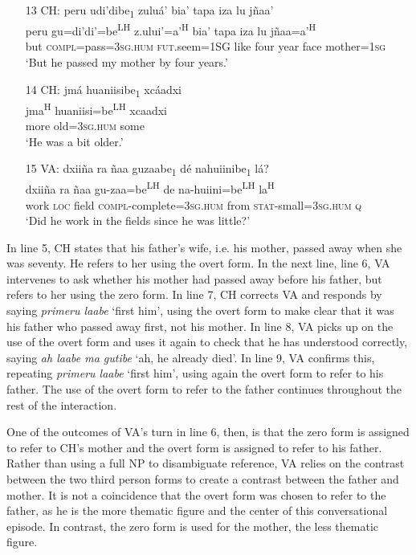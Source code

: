 \begin{itemize}
\item[13 CH:] 
\glll peru udi'dibe\textsubscript{1} zulu\'{a}' bia' tapa iza lu j\~{n}aa'  \\
peru gu=di'di'=be\textsuperscript{LH}  z.ului'=a'\textsuperscript{H} bia' tapa iza	lu j\~{n}aa=a'\textsuperscript{H}  \\
but \textsc{compl}=pass=\textsc{3sg.hum} \textsc{fut}.seem=1SG like four year face mother=\textsc{1sg}  \\
\glt `But he passed my mother by four years.'


\item[14 CH:]
\glll jm\'{a} huaniisibe\textsubscript{1} xc\'{a}adxi  \\
jma\textsuperscript{H}	huaniisi=be\textsuperscript{LH}  xcaadxi  \\
more old=\textsc{3sg.hum} some  \\
\glt `He was a bit older.'


\item[15 VA:]
dxii\~{n}a ra \~{n}aa guzaabe\textsubscript{1} d\'{e} nahuiinibe\textsubscript{1} l\'{a}?  \\
dxii\~{n}a ra \~{n}aa gu-zaa=be\textsuperscript{LH} de na-huiini=be\textsuperscript{LH} la\textsuperscript{H} \\
work \textsc{loc} field \textsc{compl}-complete=\textsc{3sg.hum} from \textsc{stat}-small=\textsc{3sg.hum} \textsc{q} \\
\glt `Did he work in the fields since he was little?'

\end{itemize}
\z

In line 5, CH states that his father's wife, i.e. his mother, passed away when she was seventy. He refers to her using the overt form. In the next line, line 6, VA intervenes to ask whether his mother had passed away before his father, but refers to her using the zero form. In line 7, CH corrects VA and responds by saying \textit{primeru laabe} `first him', using the overt form to make clear that it was his father who passed away first, not his mother. In line 8, VA picks up on the use of the overt form and uses it again to check that he has understood correctly, saying \textit{ah laabe ma gutibe} `ah, he already died'. In line 9, VA confirms this, repeating \textit{primeru laabe} `first him', using again the overt form to refer to his father. The use of the overt form to refer to the father continues throughout the rest of the interaction.

One of the outcomes of VA's turn in line 6, then, is that the zero form is assigned to refer to CH's mother and the overt form is assigned to refer to his father. Rather than using a full NP to disambiguate reference, VA relies on the contrast between the two third person forms to create a contrast between the father and mother. It is not a coincidence that the overt form was chosen to refer to the father, as he is the more thematic figure and the center of this conversational episode. In contrast, the zero form is used for the mother, the less thematic figure.

